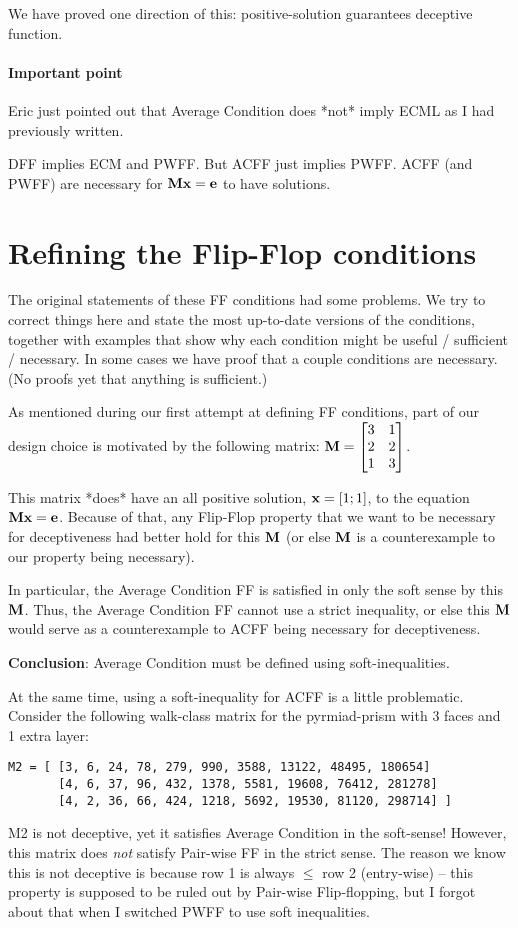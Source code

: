 We have proved one direction of this: positive-solution guarantees deceptive function.


\paragraph{Important point}

Eric just pointed out that Average Condition does *not* imply ECML as I had previously written.

DFF implies ECM and PWFF. But ACFF just implies PWFF. ACFF (and PWFF) are necessary for $\textbf{M}\textbf{x} = \textbf{e}$ to have solutions.



\section{Refining the Flip-Flop conditions}

The original statements of these FF conditions had some problems.
We try to correct things here and state the most up-to-date versions of the conditions, together with examples that show why each condition might be useful / sufficient / necessary. In some cases we have proof that a couple conditions are necessary.(No proofs yet that anything is sufficient.)


As mentioned during our first attempt at defining FF conditions, part of our design choice is motivated by the following matrix:
$\textbf{M} = \begin{bmatrix}  3 & 1 \\   2 & 2 \\ 1 & 3  \end{bmatrix}$.

This matrix *does* have an all positive solution, $\textbf{x} = [1;1]$, to the equation $\textbf{M}\textbf{x} = \textbf{e}$. Because of that, any Flip-Flop property that we want to be necessary for deceptiveness had better hold for this $\textbf{M}$ (or else $\textbf{M}$ is a counterexample to our property being necessary).

In particular, the Average Condition FF is satisfied in only the soft sense by this $\textbf{M}$. Thus, the Average Condition FF cannot use a strict inequality, or else this $\textbf{M}$ would serve as a counterexample to ACFF being necessary for deceptiveness.

\textbf{Conclusion}: Average Condition must be defined using soft-inequalities.

At the same time, using a soft-inequality for ACFF is a little problematic. Consider the following walk-class matrix for the pyrmiad-prism with 3 faces and 1 extra layer:
\begin{verbatim}
M2 = [ [3, 6, 24, 78, 279, 990, 3588, 13122, 48495, 180654]
       [4, 6, 37, 96, 432, 1378, 5581, 19608, 76412, 281278]
       [4, 2, 36, 66, 424, 1218, 5692, 19530, 81120, 298714] ]
\end{verbatim}
M2 is not deceptive, yet it satisfies Average Condition in the soft-sense!
However, this matrix does \emph{not} satisfy Pair-wise FF in the strict sense.
The reason we know this is not deceptive is because row 1 is always $\leq$ row 2 (entry-wise) -- this property is supposed to be ruled out by Pair-wise Flip-flopping, but I forgot about that when I switched PWFF to use soft inequalities.

